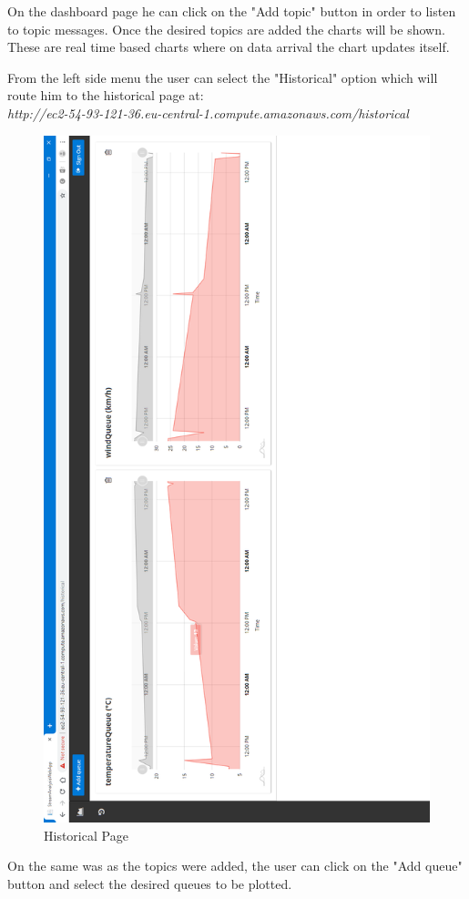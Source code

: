 On the dashboard page he can click on the "Add topic" button in order to listen to topic messages. Once the desired topics are added the charts will be shown. These are real time based charts where on data arrival the chart updates itself.

From the left side menu the user can select the "Historical" option which will route him to the historical page at:\\

\textit{http://ec2-54-93-121-36.eu-central-1.compute.amazonaws.com/historical}\\

\begin{figure}[p]
	\centering
	\noindent
	\includegraphics[width=0.5\paperwidth]{./images/guide/dashboard/historical.PNG}
	\caption{Historical Page}
	\label{fig:historical}
\end{figure}

On the same was as the topics were added, the user can click on the "Add queue" button and select the desired queues to be plotted.
